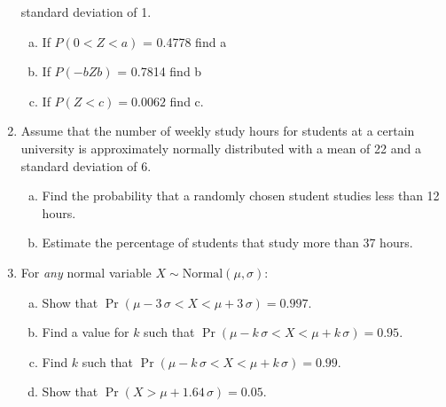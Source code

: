 \documentclass[a4paper,12pt]{article}
\begin{document}
\begin{enumerate}
standard deviation of 1.



\begin{enumerate}[(a)]

\item If   $P(0 < Z < a)$ = 0.4778 find a



\item If  $P (-b   Z   b)$ = 0.7814 find b



\item If  $P (Z < c) = 0.0062$ find c.

\end{enumerate}



\item Assume that the number of weekly study hours for students at a certain university is approximately normally distributed with a mean of 22 and a standard deviation of 6.



\begin{enumerate}[(a)]

\item Find the probability that a randomly chosen student studies less than 12 hours.

\item Estimate the percentage of students that study more than 37 hours.

\end{enumerate}





\item 

For \emph{any} normal variable $X \sim \text{Normal}(\mu,\sigma)$:

\begin{enumerate}[(a)]

\item Show that $\Pr(\mu-3\,\sigma<X<\mu+3\,\sigma) = 0.997$. \item Find a value for $k$ such that $\Pr(\mu-k\,\sigma<X<\mu+k\,\sigma) = 0.95$. \item Find $k$ such that $\Pr(\mu-k\,\sigma<X<\mu+k\,\sigma) = 0.99$. \item Show that $\Pr(X>\mu+1.64\,\sigma) = 0.05.$

\end{enumerate}




\end{enumerate}
\end{document}
